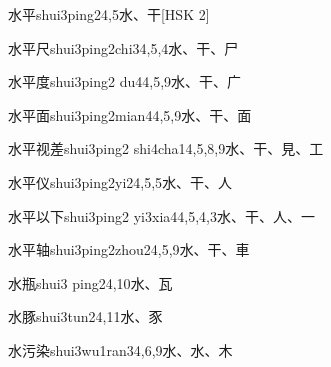 \begin{entry}{水平}{shui3ping2}{4,5}{⽔、⼲}[HSK 2]
\end{entry}

\begin{entry}{水平尺}{shui3ping2chi3}{4,5,4}{⽔、⼲、⼫}
\end{entry}

\begin{entry}{水平度}{shui3ping2 du4}{4,5,9}{⽔、⼲、⼴}
\end{entry}

\begin{entry}{水平面}{shui3ping2mian4}{4,5,9}{⽔、⼲、⾯}
\end{entry}

\begin{entry}{水平视差}{shui3ping2 shi4cha1}{4,5,8,9}{⽔、⼲、⾒、⼯}
\end{entry}

\begin{entry}{水平仪}{shui3ping2yi2}{4,5,5}{⽔、⼲、⼈}
\end{entry}

\begin{entry}{水平以下}{shui3ping2 yi3xia4}{4,5,4,3}{⽔、⼲、⼈、⼀}
\end{entry}

\begin{entry}{水平轴}{shui3ping2zhou2}{4,5,9}{⽔、⼲、⾞}
\end{entry}

\begin{entry}{水瓶}{shui3 ping2}{4,10}{⽔、⽡}
\end{entry}

\begin{entry}{水豚}{shui3tun2}{4,11}{⽔、⾗}
\end{entry}

\begin{entry}{水污染}{shui3wu1ran3}{4,6,9}{⽔、⽔、⽊}
\end{entry}

